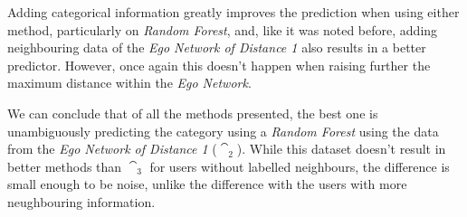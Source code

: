 Adding categorical information greatly improves the prediction when using either method, particularly on \emph{Random Forest}, and, like it was noted before, adding neighbouring data of the \emph{Ego Network of Distance 1} also results in a better predictor. However, once again this doesn't happen when raising further the maximum distance within the \emph{Ego Network}.

We can conclude that of all the methods presented, the best one is unambiguously predicting the category using a \emph{Random Forest} using the data from the \emph{Ego Network of Distance 1} ($\cat_2$). While this dataset doesn't result in better methods than $\cat_3$ for users without labelled neighbours, the difference is small enough to be noise, unlike the difference with the users with more neughbouring information.
